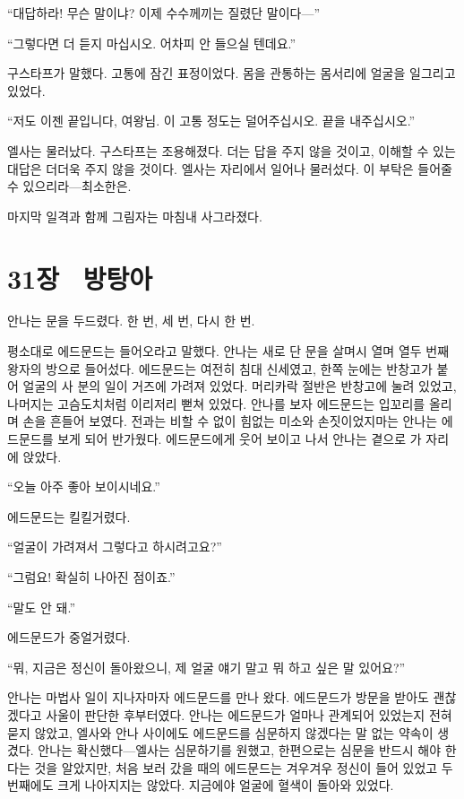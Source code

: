 ``대답하라! 무슨 말이냐? 이제 수수께끼는 질렸단 말이다—''

``그렇다면 더 듣지 마십시오. 어차피 안 들으실 텐데요.''

구스타프가 말했다. 고통에 잠긴 표정이었다. 몸을 관통하는 몸서리에 얼굴을 일그리고 있었다.

``저도 이젠 끝입니다, 여왕님. 이 고통 정도는 덜어주십시오. 끝을 내주십시오.''

엘사는 물러났다. 구스타프는 조용해졌다. 더는 답을 주지 않을 것이고, 이해할 수 있는 대답은 더더욱 주지 않을 것이다. 엘사는 자리에서 일어나 물러섰다. 이 부탁은 들어줄 수 있으리라—최소한은.

마지막 일격과 함께 그림자는 마침내 사그라졌다.



\chapter[31장  방탕아][31장\hspace*{.5em}방탕아]{31장 \ 방탕아}



안나는 문을 두드렸다. 한 번, 세 번, 다시 한 번.

평소대로 에드문드는 들어오라고 말했다. 안나는 새로 단 문을 살며시 열며 열두 번째 왕자의 방으로 들어섰다. 에드문드는 여전히 침대 신세였고, 한쪽 눈에는 반창고가 붙어 얼굴의 사 분의 일이 거즈에 가려져 있었다. 머리카락 절반은 반창고에 눌려 있었고, 나머지는 고슴도치처럼 이리저리 뻗쳐 있었다. 안나를 보자 에드문드는 입꼬리를 올리며 손을 흔들어 보였다. 전과는 비할 수 없이 힘없는 미소와 손짓이었지마는 안나는 에드문드를 보게 되어 반가웠다. 에드문드에게 웃어 보이고 나서 안나는 곁으로 가 자리에 앉았다.

``오늘 아주 좋아 보이시네요.''

에드문드는 킬킬거렸다.

``얼굴이 가려져서 그렇다고 하시려고요?''

``그럼요! 확실히 나아진 점이죠.''

``말도 안 돼.''

에드문드가 중얼거렸다.

``뭐, 지금은 정신이 돌아왔으니, 제 얼굴 얘기 말고 뭐 하고 싶은 말 있어요?''

안나는 마법사 일이 지나자마자 에드문드를 만나 왔다. 에드문드가 방문을 받아도 괜찮겠다고 사울이 판단한 후부터였다. 안나는 에드문드가 얼마나 관계되어 있었는지 전혀 묻지 않았고, 엘사와 안나 사이에도 에드문드를 심문하지 않겠다는 말 없는 약속이 생겼다. 안나는 확신했다—엘사는 심문하기를 원했고, 한편으로는 심문을 반드시 해야 한다는 것을 알았지만, 처음 보러 갔을 때의 에드문드는 겨우겨우 정신이 들어 있었고 두 번째에도 크게 나아지지는 않았다. 지금에야 얼굴에 혈색이 돌아와 있었다.

